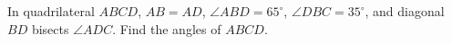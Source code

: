 In quadrilateral $ABCD$, $AB=AD$, $\angle ABD=65^\circ$, $\angle DBC=35^\circ$, and diagonal $BD$ bisects $\angle ADC$. Find the angles of $ABCD$.
